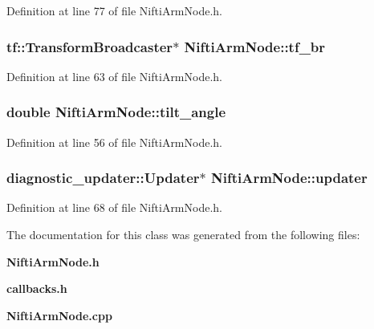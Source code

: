 \-Definition at line 77 of file \-Nifti\-Arm\-Node.\-h.

\subsubsection[{tf\-\_\-br}]{\setlength{\rightskip}{0pt plus 5cm}tf\-::\-Transform\-Broadcaster$\ast$ {\bf \-Nifti\-Arm\-Node\-::tf\-\_\-br}\hspace{0.3cm}{\ttfamily  [private]}}\label{classNiftiArmNode_a9de7b8377a8d1f34b22dae8fc2ff34f9}


\-Definition at line 63 of file \-Nifti\-Arm\-Node.\-h.

\subsubsection[{tilt\-\_\-angle}]{\setlength{\rightskip}{0pt plus 5cm}double {\bf \-Nifti\-Arm\-Node\-::tilt\-\_\-angle}\hspace{0.3cm}{\ttfamily  [private]}}\label{classNiftiArmNode_a3033f5487d577280345b9e32b36c26fb}


\-Definition at line 56 of file \-Nifti\-Arm\-Node.\-h.

\subsubsection[{updater}]{\setlength{\rightskip}{0pt plus 5cm}diagnostic\-\_\-updater\-::\-Updater$\ast$ {\bf \-Nifti\-Arm\-Node\-::updater}\hspace{0.3cm}{\ttfamily  [private]}}\label{classNiftiArmNode_a34cabd88ad8ae993998efaa6014614b6}


\-Definition at line 68 of file \-Nifti\-Arm\-Node.\-h.



\-The documentation for this class was generated from the following files\-:\begin{DoxyCompactItemize}
\item 
{\bf \-Nifti\-Arm\-Node.\-h}\item 
{\bf callbacks.\-h}\item 
{\bf \-Nifti\-Arm\-Node.\-cpp}\end{DoxyCompactItemize}
